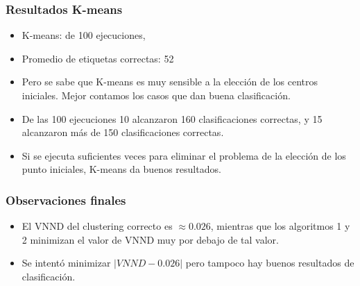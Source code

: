 \documentclass[11pt]{beamer}
\begin{document}
        \begin{frame}
        \frametitle{Resultados K-means}
    \begin{itemize}
        \item K-means: de 100 ejecuciones, 
        \item Promedio de etiquetas correctas: 52 
        \item Pero se sabe que K-means es muy sensible a la elección de los centros iniciales. Mejor contamos los casos
            que dan buena clasificación. 
        \item De las 100 ejecuciones 10 alcanzaron 160 clasificaciones correctas, y 15 alcanzaron más de 150
            clasificaciones correctas. 
        \item Si se ejecuta suficientes veces para eliminar el problema de la elección de los punto iniciales, K-means
            da buenos resultados.
    \end{itemize}
\end{frame}
%
    \begin{frame}
        \frametitle{Observaciones finales}
        \begin{itemize}
            \item El VNND del clustering correcto es $\approx0.026$, mientras que los algoritmos 1 y 2 minimizan el
                valor de VNND muy por debajo de tal valor. 
            \item Se intentó minimizar $|VNND-0.026|$ pero tampoco hay buenos resultados de clasificación. 
        \end{itemize}
    \end{frame}
\end{document}
